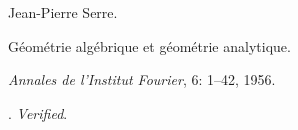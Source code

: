 Jean-Pierre Serre.

\newblock G\'eom\'etrie alg\'ebrique et g\'eom\'etrie analytique.

\newblock \emph{Annales de l'Institut Fourier}, 6: 1--42, 1956.

\newblock {}.
\newblock \emph{Verified}.

